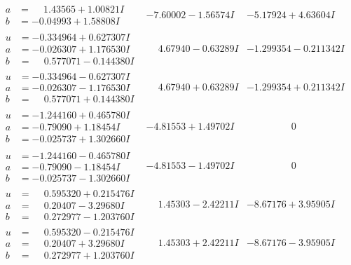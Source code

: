 \documentclass[1p]{elsarticle_modified}
\theoremstyle{definition}
\begin{document}
$$\begin{array}{c|c|c}
\begin{aligned}
a &= \phantom{-}1.43565 + 1.00821 I \\
b &= -0.04993 + 1.58808 I\end{aligned}
 & -7.60002 - 1.56574 I & -5.17924 + 4.63604 I \\ \hline\begin{aligned}
u &= -0.334964 + 0.627307 I \\
a &= -0.026307 + 1.176530 I \\
b &= \phantom{-}0.577071 - 0.144380 I\end{aligned}
 & \phantom{-}4.67940 - 0.63289 I & -1.299354 - 0.211342 I \\ \hline\begin{aligned}
u &= -0.334964 - 0.627307 I \\
a &= -0.026307 - 1.176530 I \\
b &= \phantom{-}0.577071 + 0.144380 I\end{aligned}
 & \phantom{-}4.67940 + 0.63289 I & -1.299354 + 0.211342 I \\ \hline\begin{aligned}
u &= -1.244160 + 0.465780 I \\
a &= -0.79090 + 1.18454 I \\
b &= -0.025737 + 1.302660 I\end{aligned}
 & -4.81553 + 1.49702 I & \phantom{-0.000000 } 0 \\ \hline\begin{aligned}
u &= -1.244160 - 0.465780 I \\
a &= -0.79090 - 1.18454 I \\
b &= -0.025737 - 1.302660 I\end{aligned}
 & -4.81553 - 1.49702 I & \phantom{-0.000000 } 0 \\ \hline\begin{aligned}
u &= \phantom{-}0.595320 + 0.215476 I \\
a &= \phantom{-}0.20407 - 3.29680 I \\
b &= \phantom{-}0.272977 - 1.203760 I\end{aligned}
 & \phantom{-}1.45303 - 2.42211 I & -8.67176 + 3.95905 I \\ \hline\begin{aligned}
u &= \phantom{-}0.595320 - 0.215476 I \\
a &= \phantom{-}0.20407 + 3.29680 I \\
b &= \phantom{-}0.272977 + 1.203760 I\end{aligned}
 & \phantom{-}1.45303 + 2.42211 I & -8.67176 - 3.95905 I \\ \hline\begin{aligned}

\end{aligned}
\end{array}$$
\end{document}
